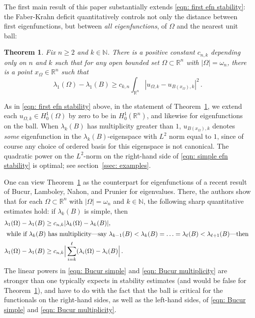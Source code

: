 \documentclass[10pt, reqno]{amsart}
\numberwithin{equation}{section}
\newtheorem{theorem}{Theorem}[section]
\def\R{{\mathbb R}}
\def\W{\Omega}
\begin{document}
The first main result of this paper substantially extends \eqref{eqn: first efn stability}: the Faber-Krahn deficit quantitatively controls not only the distance between first eigenfunctions,  but between  {\it all eigenfunctions}, of $\W$ and the nearest unit ball:


\begin{theorem}\label{thm: eigenfunction estimates} Fix $n \geq 2$ and $k \in \mathbb{N}$. There is a positive constant $c_{n,k}$ depending only on $n$ and $k$ such that 
for any open bounded set $\Omega \subset \R^n$ with $|\Omega| = \omega_n$, there is a point $x_\W \in \R^n$ such that
\begin{equation}\label{eqn: simple efn stability}
\lambda_1(\W ) - \lambda_1(B)  \geq c_{k, n} \int_{\mathbb{R}^n}\left|u_{\Omega, k}-u_{B({x_\W}),k}\right|^2\,.
 \end{equation}
\end{theorem}
As in \eqref{eqn: first efn stability} above, in the statement of Theorem~\ref{thm: eigenfunction estimates}, we extend each $u_{\W,k} \in H^1_0(\W)$ by zero to be in $H^1_0(\R^n)$, and likewise for eigenfunctions on the ball.  When $\lambda_k(B)$ has multiplicity greater than $1$, $u_{B({x_\W}),k}$ denotes {\it some} eigenfunction in the $\lambda_k(B)$-eigenspace with $L^2$ norm equal to $1$, since of course any choice of ordered basis for this eigenspace is not canonical. The quadratic power on the $L^2$-norm on the right-hand side of \eqref{eqn: simple efn stability} is optimal; see section~\ref{ssec: examples}.

One can view Theorem~\ref{thm: eigenfunction estimates} as the counterpart for eigenfunctions of a recent result of Bucur, Lamboley, Nahon, and Prunier \cite{blnp23} for eigenvalues. There, the authors show  that
for each $\Omega \subset \R^n$ with $|\Omega| = \omega_n$ and  $k \in \mathbb{N}$, the following sharp quantitative estimates hold: if $\lambda_k(B)$ is simple, then 
\begin{align}\label{eqn: Bucur simple}
 \lambda_1(\W ) - \lambda_1(B)   & \geq c_{n,k}  |\lambda_k(\W)-\lambda_k(B)|,   \\
 \intertext{
while if $\lambda_k(B)$ has multiplicity---say $\lambda_{k-1}(B) <  \lambda_k(B)=\ldots=\lambda_{\ell}(B) < \lambda_{\ell+1}(B)$---then 
 }
 \label{eqn: Bucur multiplicity}
 \lambda_1(\W ) - \lambda_1(B)    &\geq c_{n,k}    \Big| \sum_{i=k}^\ell ( \lambda_i (\W) - \lambda_i(B) \Big| \,.
\end{align}
The linear powers in \eqref{eqn: Bucur simple} and \eqref{eqn: Bucur multiplicity} are stronger than one typically expects in stability estimates (and would be false for Theorem~\ref{thm: eigenfunction estimates}), and have to do with the fact that the ball is critical for the functionals on the right-hand sides, as well as the left-hand sides, of \eqref{eqn: Bucur simple} and \eqref{eqn: Bucur multiplicity}. 
\end{document}
